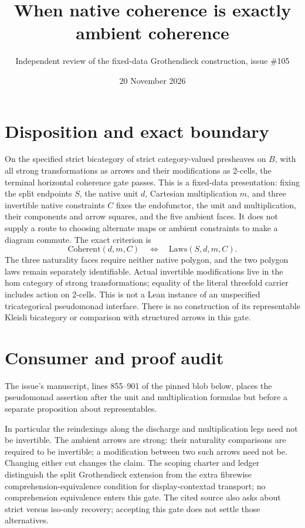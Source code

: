 \documentclass[11pt]{article}
\title{When native coherence is exactly ambient coherence}
\author{Independent review of the fixed-data Grothendieck construction, issue \#105}
\date{20 November 2026}
\newcommand{\hash}[1]{\par\noindent{\footnotesize\ttfamily #1}\par}
\begin{document}
\maketitle
\section*{Disposition and exact boundary}
On the specified strict bicategory of strict category-valued presheaves on
$B$, with all strong transformations as arrows and their modifications as
2-cells, the terminal horizontal coherence gate passes. This is a fixed-data
presentation: fixing the split endpoints $S$, the native unit $d$, Cartesian
multiplication $m$, and three invertible native constraints $C$ fixes the
endofunctor, the unit and multiplication, their components and arrow squares,
and the five ambient faces. It does not supply a route to choosing alternate
maps or ambient constraints to make a diagram commute. The exact criterion is
\[
  \mathrm{Coherent}(d,m,C)\quad\Longleftrightarrow\quad
  \mathrm{Laws}(S,d,m,C).
\]
The three naturality faces require neither native polygon, and the two polygon
laws remain separately identifiable. Actual invertible modifications live in
the hom category of strong transformations; equality of the literal
threefold carrier includes action on 2-cells. This is not a Lean instance of
an unspecified tricategorical pseudomonad interface. There is no construction
of its representable Kleisli bicategory or comparison with structured arrows
in this gate.

\section*{Consumer and proof audit}
The issue's manuscript, lines 855--901 of the pinned blob below, places the
pseudomonad assertion after the unit and multiplication formulas but before a
separate proposition about representables.\hash{b1e84592f59558c851faabb5291d7392d2b2f908}
In particular the reindexings along
the discharge and multiplication legs need not be invertible. The ambient
arrows are strong: their naturality comparisons are required to be invertible;
a modification between two such arrows need not be. Changing either cut
changes the claim. The scoping charter and ledger distinguish the split Grothendieck extension from the extra fibrewise comprehension-equivalence condition for display-contextad transport; no comprehension equivalence enters this gate. The cited source also asks about strict versus iso-only
recovery; accepting this gate does not settle those alternatives.
\end{document}

